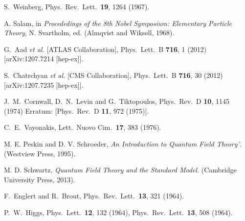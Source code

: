 \documentclass[12pt]{article}
\begin{document}
\begin{thebibliography}{99}


  S.~Weinberg,
  Phys.\ Rev.\ Lett.\  {\bf 19}, 1264 (1967).

A. Salam, in {\it Procededings of the 8th Nobel Symposium: Elementary
  Particle Theory}, N. Svartholm, ed. (Almqvist and Wiksell, 1968).

 G.~Aad {\it et al.}  [ATLAS Collaboration],
  Phys.\ Lett.\ B {\bf 716}, 1 (2012)
  [arXiv:1207.7214 [hep-ex]].

S.~Chatrchyan {\it et al.}  [CMS Collaboration],
  Phys.\ Lett.\ B {\bf 716}, 30 (2012)
  [arXiv:1207.7235 [hep-ex]].

  J.~M.~Cornwall, D.~N.~Levin and G.~Tiktopoulos,
  Phys.\ Rev.\ D {\bf 10}, 1145 (1974)
  Erratum: [Phys.\ Rev.\ D {\bf 11}, 972 (1975)].


 C.~E.~Vayonakis,
  Lett.\ Nuovo Cim.\  {\bf 17}, 383 (1976).


M. E. Peskin and D. V. Schroeder, {\it An Introduction to Quantum
  Field Theory'}.  (Westview Press, 1995). 

M. D. Schwartz, {\it Quantum Field Theory and the Standard Model}.
(Cambridge University Press, 2013).

  F.~Englert and R.~Brout,
  Phys.\ Rev.\ Lett.\  {\bf 13}, 321 (1964).
 

  P.~W.~Higgs,
  Phys.\ Lett.\  {\bf 12}, 132 (1964),
  Phys.\ Rev.\ Lett.\  {\bf 13}, 508 (1964).
 

\end{thebibliography}
\end{document}
